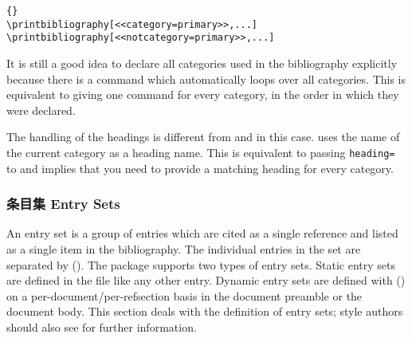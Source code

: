 \begin{lstlisting}[style=latex]{}
\printbibliography[<<category=primary>>,...]
\printbibliography[<<notcategory=primary>>,...]
\end{lstlisting}
%
It is still a good idea to declare all categories used in the bibliography explicitly because there is a  command which automatically loops over all categories. This is equivalent to giving one  command for every category, in the order in which they were declared.

%
The handling of the headings is different from  and  in this case.  uses the name of the current category as a heading name. This is equivalent to passing \texttt{heading=} to  and implies that you need to provide a matching heading for every category.

\subsubsection{条目集 Entry Sets}
\label{use:use:set}

An entry set is a group of entries which are cited as a single reference and listed as a single item in the bibliography. The individual entries in the set are separated by  (). The \biblatex package supports two types of entry sets. Static entry sets are defined in the  file like any other entry. Dynamic entry sets are defined with  () on a per-document\slash per-refsection basis in the document preamble or the document body. This section deals with the definition of entry sets; style authors should also see  for further information.


